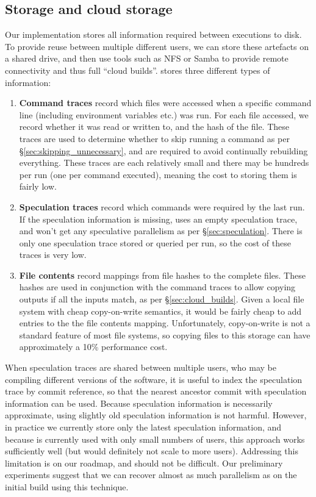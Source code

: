 \subsection{Storage and cloud storage}
\label{sec:cloud_implementation}

Our \Rattle implementation stores all information required between executions to disk. To provide reuse between multiple different users, we can store these artefacts on a shared drive, and then use tools such as NFS or Samba to provide remote connectivity and thus full ``cloud builds''. \Rattle stores three different types of information:

\begin{enumerate}
\item \textbf{Command traces} record which files were accessed when a specific command line (including environment variables etc.) was run. For each file accessed, we record whether it was read or written to, and the hash of the file. These traces are used to determine whether to skip running a command as per \S\ref{sec:skipping_unnecessary}, and are required to avoid continually rebuilding everything. These traces are each relatively small and there may be hundreds per run (one per command executed), meaning the cost to storing them is fairly low.
\item \textbf{Speculation traces} record which commands were required by the last run. If the speculation information is missing, \Rattle uses an empty speculation trace, and won't get any speculative parallelism as per \S\ref{sec:speculation}. There is only one speculation trace stored or queried per run, so the cost of these traces is very low.
\item \textbf{File contents} record mappings from file hashes to the complete files. These hashes are used in conjunction with the command traces to allow copying outputs if all the inputs match, as per \S\ref{sec:cloud_builds}. Given a local file system with cheap copy-on-write semantics, it would be fairly cheap to add entries to the the file contents mapping. Unfortunately, copy-on-write is not a standard feature of most file systems, so copying files to this storage can have approximately a 10\% performance cost.
\end{enumerate}

When speculation traces are shared between multiple users, who may be compiling different versions of the software, it is useful to index the speculation trace by commit reference, so that the nearest ancestor commit with speculation information can be used. Because speculation information is necessarily approximate, using slightly old speculation information is not harmful. However, in practice we currently store only the latest speculation information, and because \Rattle is currently used with only small numbers of users, this approach works sufficiently well (but would definitely not scale to more users). Addressing this limitation is on our roadmap, and should not be difficult. Our preliminary experiments suggest that we can recover almost as much parallelism as \Make on the initial build using this technique.

